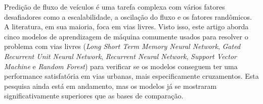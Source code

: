 Predição de fluxo de veículos é uma tarefa complexa com vários fatores desafiadores como a escalabilidade, a oscilação do fluxo e os fatores randômicos. A literatura, em sua maioria, foca em vias livres. Visto isso, este artigo aborda cinco modelos de aprendizagem de máquina comumente usados para resolver o problema com vias livres (\textit{Long Short Term Memory Neural Network}, \textit{Gated Recurrent Unit Neural Network}, \textit{Recurrent Neural Network}, \textit{Support Vector Machine} e \textit{Random Forest}) para verificar se os modelos conseguem ter uma performance satisfatória em vias urbanas, mais especificamente cruzamentos. Esta pesquisa ainda está em andamento, mas os modelos já se mostraram significativamente superiores que as bases de comparação.